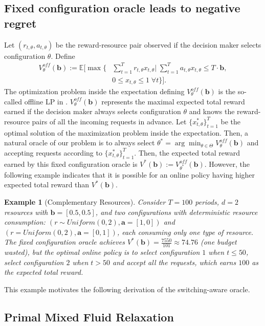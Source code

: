 \documentclass[11pt]{article}
\newtheorem{example}{Example}
\newcommand{\bb}{\mathbf{b}}
\newcommand{\ba}{\mathbf{a}}
\begin{document}
\subsection{Fixed configuration oracle leads to negative regret}\label{Section: FCO}
Let $(r_{t,\theta},a_{t,\theta})$ be the reward-resource pair observed if the decision maker selects configuration $\theta$. Define
\begin{equation*}
\begin{split}
V^{off}_{\theta}(\bb) := \mathbb{E}\Big [\max \Big\{ & \sum_{t=1}^Tr_{t,\theta}x_{t,\theta}\Big|\; \sum_{t=1}^Ta_{t,\theta}x_{t,\theta}\leq T\cdot\bb, \\
& 0\leq x_{t,\theta}\leq 1\;\forall t \Big\}\Big ].
\end{split}
\end{equation*}
The optimization problem inside the expectation defining $V^{off}_{\theta}(\bb)$ is the so-called offline LP in \cite{li2022online}. $V^{off}_{\theta}(\bb)$ represents the maximal expected total reward earned if the decision maker always selects configuration $\theta$ and knows the reward-resource pairs of all the incoming requests in advance. Let $\{x_{t,\theta}^*\}_{t=1}^T$ be the optimal solution of the maximization problem inside the expectation. Then, a natural oracle of our problem is to always select $\theta^*=\arg\min_{\theta\in\Theta}V^{off}_{\theta}(\bb)$ and accepting requests according to $\{x_{t,\theta}^*\}_{t=1}^T$. Then, the expected total reward earned by this fixed configuration oracle is $V^*(\bb):=V^{off}_{\theta^*}(\bb)$. However, the following example indicates that it is possible for an online policy having higher expected total reward than $V^*(\bb)$.
\begin{example}[Complementary Resources]
\label{ex:pathology}
Consider $T=100$ periods, $d=2$ resources with $\bb = [0.5, 0.5]$, and two configurations with deterministic resource consumption: $(r\sim Uniform(0,2), \ba=[1,0])$ and $(r=Uniform(0,2), \ba=[0,1])$, each consuming only one type of resource. The fixed configuration oracle achieves $V^*(\bb) = \frac{7550}{101}\approx74.76$ (one budget wasted), but the optimal online policy is to select configuration $1$ when $t\leq 50$, select configuration $2$ when $t>50$ and accept all the requests, which earns $100$ as the expected total reward.
\end{example}
This example motivates the following derivation of the switching-aware oracle.
\subsection{Primal Mixed Fluid Relaxation}
\end{document}
